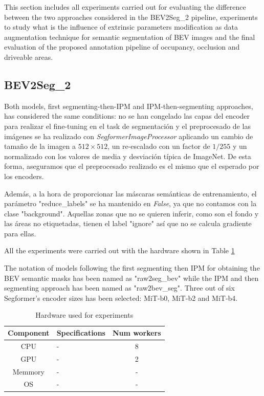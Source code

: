 
This section includes all experiments carried out for evaluating the difference between the two approaches considered in the BEV2Seg\_2 pipeline, experiments to study what is the influence of extrinsic parameters modification as data augmentation technique for semantic segmentation of BEV images and the final evaluation of the proposed annotation pipeline of occupancy, occlusion and driveable areas.

\subsection{BEV2Seg\_2}
Both models, first segmenting-then-IPM and IPM-then-segmenting approaches, has considered the same conditions: no se han congelado las capas del encoder para realizar el fine-tuning en el task de segmentación y el preprocesado de las imágenes se ha realizado con \textit{SegformerImageProcessor} aplicando un cambio de tamaño de la imagen a $512 \times 512$, un re-escalado con un factor de $1/255$ y un normalizado con los valores de media y desviación típica de ImageNet. De esta forma, aseguramos que el preprocesado realizado es el mismo que el esperado por los encoders. 

Además, a la hora de proporcionar las máscaras semánticas de entrenamiento, el parámetro "reduce\_labels" se ha mantenido en \textit{False}, ya que no contamos con la clase "background". Aquellas zonas que no se quieren inferir, como son el fondo y las áreas no etiquetadas, tienen el label "ignore" así que no se calcula gradiente para ellas.

All the experiments were carried out with the hardware shown in Table \ref{tab:hardware}


The notation of models following the first segmenting then IPM for obtaining the BEV semantic masks has been named as "raw2seg\_bev" while the IPM and then segmenting approach has been named as "raw2bev\_seg". Three out of six Segformer's encoder sizes has been selected: MiT-b0, MiT-b2 and MiT-b4.

\begin{table}[h]
    \centering
    \begin{tabular}{c l c}
        \toprule
        \textbf{Component} & \textbf{Specifications} & \textbf{Num workers} \\
        \midrule
        CPU         & - & 8 \\
        GPU         & - & 2 \\      
        Memmory     & - & - \\
        OS          & - & - \\
        \bottomrule
    \end{tabular}
    \caption{ Hardware used for experiments }
    \label{tab:hardware}
\end{table}

